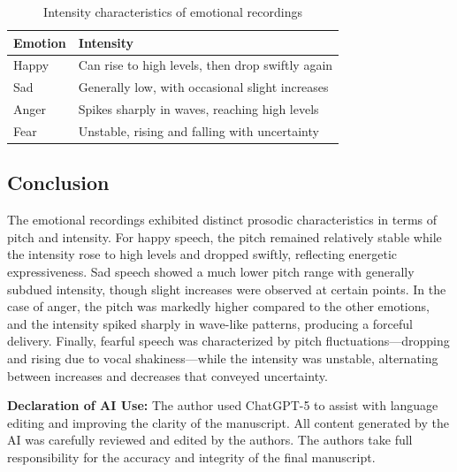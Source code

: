 \documentclass{article}
\begin{document}
	\begin{table}[h]
		\centering
		\caption{Intensity characteristics of emotional recordings}
		\begin{tabular}{ll}
			\hline
			\textbf{Emotion} & \textbf{Intensity}                               \\
			\hline
			Happy            & Can rise to high levels, then drop swiftly again \\
			Sad              & Generally low, with occasional slight increases  \\
			Anger            & Spikes sharply in waves, reaching high levels    \\
			Fear             & Unstable, rising and falling with uncertainty    \\
			\hline
		\end{tabular}\label{tab:intensity}
	\end{table}
	
	\subsection{Conclusion}
	The emotional recordings exhibited distinct prosodic characteristics in terms
	of pitch and intensity. For happy speech, the pitch remained relatively stable
	while the intensity rose to high levels and dropped swiftly, reflecting
	energetic expressiveness. Sad speech showed a much lower pitch range with
	generally subdued intensity, though slight increases were observed at certain
	points. In the case of anger, the pitch was markedly higher compared to the
	other emotions, and the intensity spiked sharply in wave-like patterns,
	producing a forceful delivery. Finally, fearful speech was characterized by
	pitch fluctuations—dropping and rising due to vocal shakiness—while the
	intensity was unstable, alternating between increases and decreases that
	conveyed uncertainty.
	
	
	
	
	\vfill
	{\footnotesize
		\noindent\textbf{Declaration of AI Use:} The author used ChatGPT-5 to 
		assist with language editing and improving the clarity of the manuscript. 
		All content generated by the AI was carefully reviewed and edited by the 
		authors. The authors take full responsibility for the accuracy and integrity 
		of the final manuscript.
		\par}
\end{document}
